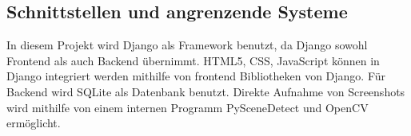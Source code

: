 \subsection{Schnittstellen und angrenzende Systeme} 

In diesem Projekt wird Django als Framework benutzt, da Django sowohl Frontend als auch Backend übernimmt. HTML5, CSS, JavaScript können in Django integriert werden mithilfe 
von frontend Bibliotheken von Django. Für Backend wird SQLite als Datenbank benutzt. Direkte Aufnahme von Screenshots wird mithilfe von einem internen Programm PySceneDetect 
und OpenCV ermöglicht.
